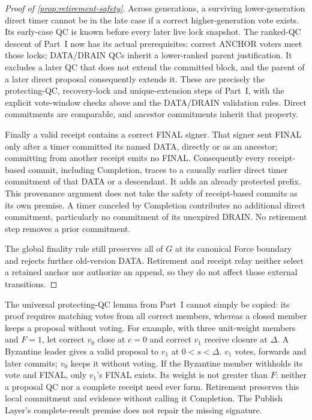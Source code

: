 \documentclass[11pt,a4paper]{article}
\begin{document}
\begin{proof}[Proof of \cref{prop:retirement-safety}]
Across generations, a surviving lower-generation direct timer cannot
be in the late case if a correct higher-generation vote exists.
Its early-case QC is known before every later live lock snapshot.
The ranked-QC descent of Part~I now has its actual prerequisites:
correct ANCHOR voters meet those locks; DATA/DRAIN QCs inherit a
lower-ranked parent justification. It excludes a later QC that does
not extend the committed block, and the parent of a later direct
proposal consequently extends it. These are precisely the
protecting-QC, recovery-lock and unique-extension steps of Part~I,
with the explicit vote-window checks above and the
DATA/DRAIN validation rules. Direct commitments are comparable, and
ancestor commitments inherit that property.

Finally a valid receipt contains a correct FINAL signer. That signer
sent FINAL only after a timer committed its named DATA, directly or
as an ancestor; committing from another receipt emits no FINAL.
Consequently every receipt-based commit, including Completion, traces
to a causally earlier direct timer commitment of that DATA or a
descendant. It adds an already protected prefix. This provenance
argument does not take the safety of receipt-based commits as its own
premise. A timer canceled by Completion contributes no additional
direct commitment, particularly no commitment of its unexpired DRAIN.
No retirement step removes a prior commitment.

The global finality rule still preserves all of $G$ at its canonical
Force boundary and rejects further old-version DATA. Retirement and
receipt relay neither select a retained anchor nor authorize an
append, so they do not affect those external transitions.
\end{proof}


The universal protecting-QC lemma from Part~I cannot simply be copied:
its proof requires matching votes from all correct members, whereas a
closed member keeps a proposal without voting. For example, with
three unit-weight members and $F=1$, let correct $v_0$ close at $c=0$
and correct $v_1$ receive closure at $\Delta$. A Byzantine leader gives
a valid proposal to $v_1$ at $0<s<\Delta$. $v_1$ votes, forwards and
later commits; $v_0$ keeps it without voting. If the Byzantine member
withholds its vote and FINAL, only $v_1$'s FINAL exists. Its weight is
not greater than $F$: neither a proposal QC nor a complete receipt need
ever form. Retirement preserves this local commitment and evidence
without calling it Completion. The Publish Layer's complete-result
premise does not repair the missing signature.
\end{document}

